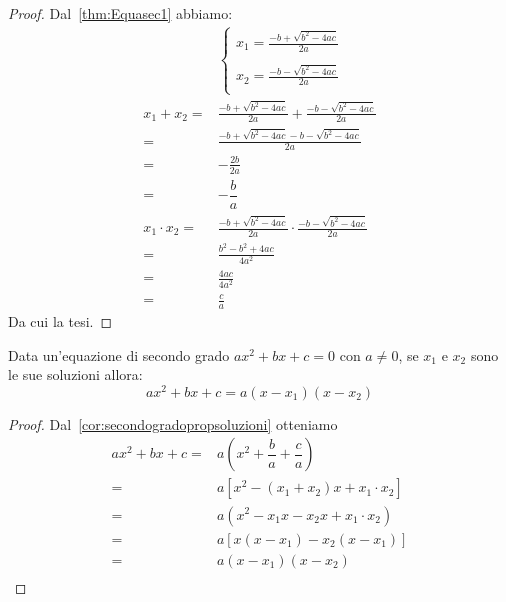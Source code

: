 \begin{proof}Dal~\vref{thm:Equasec1} abbiamo:
	\begin{align*}
	&\begin{cases}
	x_1=\frac{-b+\sqrt{b^2-4ac}}{2a}\\
	\\
	x_2=\frac{-b-\sqrt{b^2-4ac}}{2a}\\
	\end{cases}\\
	x_1+x_2=&\frac{-b+\sqrt{b^2-4ac}}{2a}+\frac{-b-\sqrt{b^2-4ac}}{2a}\\
	=&\frac{-b+\sqrt{b^2-4ac}-b-\sqrt{b^2-4ac}}{2a}\\
	=&-\frac{2b}{2a}\\
	=&-\dfrac{b}{a}\\
	x_1\cdot x_2=&\frac{-b+\sqrt{b^2-4ac}}{2a}\cdot\frac{-b-\sqrt{b^2-4ac}}{2a}\\
	=&\frac{b^2-b^2+4ac}{4a^2}\\
	=&\frac{4ac}{4a^2}\\
	=&\frac{c}{a}
	\end{align*}
	Da cui la tesi.
\end{proof}
\begin{cor}\label{cor:Scomposizionetrisecgrad}
Data un'equazione di secondo grado $ax^2+bx+c=0$ con $a\neq 0$, se $x_1$ e $x_2$ sono le sue soluzioni allora:\[ax^2+bx+c=a\left(x-x_1\right)\left(x-x_2\right) \]
\end{cor}
\begin{proof}Dal~\vref{cor:secondogradopropsoluzioni} otteniamo
	\begin{align*}
ax^2+bx+c=&a\left(x^2+\dfrac{b}{a}+\dfrac{c}{a}\right)\\
=&a\left[x^2-\left(x_1+x_2\right)x+x_1\cdot x_2\right]\\
=&a\left(x^2-x_1x-x_2x+x_1\cdot x_2\right)\\
=&a\left[x\left(x-x_1\right)-x_2\left(x-x_1\right)\right]\\
=&a\left(x-x_1\right)\left(x-x_2\right)\\
	\end{align*}
\end{proof}
